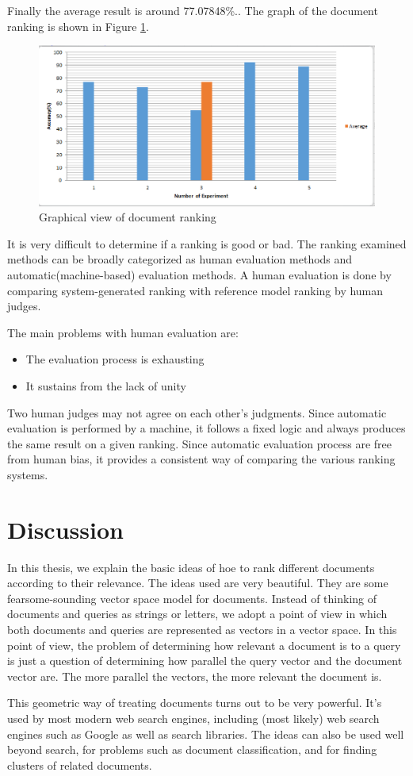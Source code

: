 Finally the average result is around 77.07848\%..
The graph of the document ranking is shown in Figure \ref{Figure:granking}.


\begin{figure}[htp]
	\centering
		\includegraphics[width=.65\textwidth]{figure/six.eps}
	\caption{Graphical view of document ranking}
	\label{Figure:granking}
\end{figure}


It is very difficult to determine if a ranking is good or bad. The ranking examined methods can be broadly categorized as human evaluation methods and automatic(machine-based) evaluation methods. A human evaluation is done by comparing system-generated ranking with reference model ranking by human judges.

The main problems with human evaluation are:

\begin{itemize}
	\item The evaluation process is exhausting
	\item It sustains from the lack of unity
\end{itemize}

Two human judges may not agree on each other’s judgments. Since automatic evaluation is performed by a machine, it follows a fixed logic and always produces the same result on a given ranking. Since automatic evaluation process are free from human bias, it provides a consistent way of comparing the various ranking systems.


\section{Discussion}

In this thesis, we explain the basic ideas of hoe to rank different documents according to their relevance. The ideas used are very beautiful. They are some fearsome-sounding vector space model for documents. Instead of thinking of documents and queries as strings or letters, we adopt a point of view in which both documents and queries are represented as vectors in a vector space. In this point of view, the problem of determining how relevant a document is to a query is just a question of determining how parallel the query vector and the document vector are. The more parallel the vectors, the more relevant the document is.

This geometric way of treating documents turns out to be very powerful. It’s used by most modern web search engines, including (most likely) web search engines such as Google as well as search libraries. The ideas can also be used well beyond search, for problems such as document classification, and for finding clusters of related documents.

